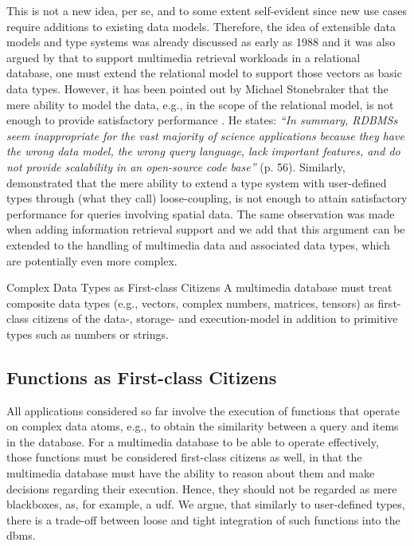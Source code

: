This is not a new idea, per se, and to some extent self-evident since new use cases require additions to existing data models. Therefore, the idea of extensible data models and type systems was already discussed as early as 1988 \cite{Linnemann:1988Design} and it was also argued by \cite{Giangreco:2018Database} that to support multimedia retrieval workloads in a relational database, one must extend the relational model to support those vectors as basic data types. However, it has been pointed out by Michael Stonebraker that the mere ability to model the data, e.g., in the scope of the relational model, is not enough to provide satisfactory performance \cite{Stonebraker:2013SciDB}. He states: \emph{``In summary, RDBMSs seem inappropriate for the vast majority of science applications because they have the wrong data model, the wrong query language, lack important features, and do not provide scalability in an open-source code base''} \cite{Stonebraker:2013SciDB} (p. 56). Similarly, \cite{Whang:2010Tightly} demonstrated that the mere ability to extend a type system with user-defined types through (what they call) loose-coupling, is not enough to attain satisfactory performance for queries involving spatial data. The same observation was made when adding information retrieval support \cite{Whang:2015DB} and we add that this argument can be extended to the handling of multimedia data and associated data types, which are potentially even more complex.

\begin{requirement}[label=requirement:complex_data_types]{Complex Data Types as First-class Citizens}{}
    A multimedia database must treat composite data types (e.g., vectors, complex numbers, matrices, tensors) as first-class citizens of the data-, storage- and execution-model in addition to primitive types such as numbers or strings.
\end{requirement}

\subsection{Functions as First-class Citizens}

All applications considered so far involve the execution of functions that operate on complex data atoms, e.g., to obtain the similarity between a query and items in the database. For a multimedia database to be able to operate effectively, those functions must be considered first-class citizens as well, in that the multimedia database must have the ability to reason about them and make decisions regarding their execution. Hence, they should not be regarded as mere blackboxes, as, for example, a \acrfull{udf}. We argue, that similarly to user-defined types, there is a trade-off between loose and tight integration of such functions into the \acrshort{dbms}.

